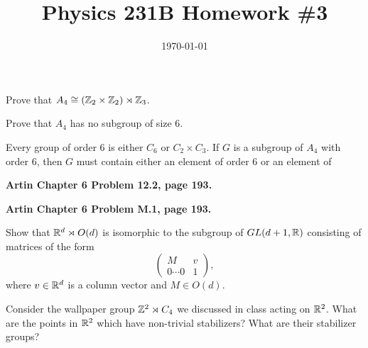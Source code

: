 \documentclass{article}
\date{\today}
\title{Physics 231B Homework \#3}
\begin{document}
\maketitle

\bigskip
\begin{prob}
    Prove that $A_4 \cong (\mathbb{Z}_2 \times \mathbb{Z}_2) \rtimes \mathbb{Z}_3$.
\end{prob}

\bigskip
\begin{prob}
    Prove that $A_4$ has no subgroup of size 6.
\end{prob}
Every group of order 6 is either $C_6$ or $C_2 \times C_3$. If $G$ is a subgroup of $A_4$ with order 6, then $G$ must contain either an element of order 6 or an element of 

\bigskip
\begin{prob}
    \textbf{Artin Chapter 6 Problem 12.2, page 193.}
\end{prob}

\bigskip
\begin{prob}
    \textbf{Artin Chapter 6 Problem M.1, page 193.}
\end{prob}

\bigskip
\begin{prob}
    Show that $\mathbb{R}^d \rtimes O(d)$ is isomorphic to the subgroup of $GL(d+1, \mathbb{R})$ consisting of matrices of the form
    \[ \begin{pmatrix}
        M & v \\
        0 \cdots 0 & 1
    \end{pmatrix}, \]
    where $v \in \mathbb{R}^d$ is a column vector and $M \in O(d)$.
\end{prob}

\bigskip
\begin{prob}
    Consider the wallpaper group $\mathbb{Z}^2 \rtimes C_4$ we discussed in class acting on $\mathbb{R}^2$. What are the points in $\mathbb{R}^2$ which have non-trivial stabilizers? What are their stabilizer groups?
\end{prob}
\end{document}
